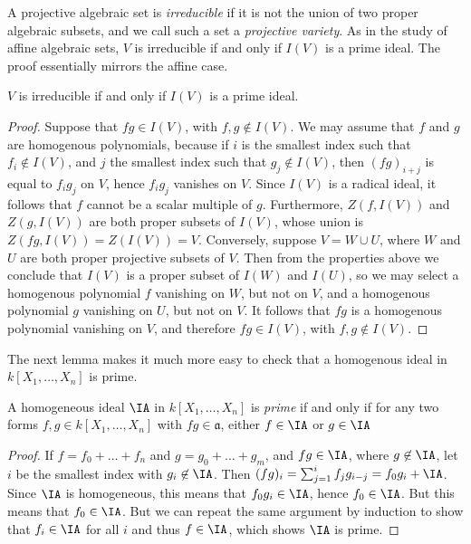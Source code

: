 A projective algebraic set is \emph{irreducible} if it is not the union of two proper algebraic subsets, and we call such a set a \emph{projective variety}. As in the study of affine algebraic sets, $V$ is irreducible if and only if $I(V)$ is a prime ideal. The proof essentially mirrors the affine case.

\begin{theorem}
    $V$ is irreducible if and only if $I(V)$ is a prime ideal.
\end{theorem}
\begin{proof}
    Suppose that $fg \in I(V)$, with $f,g \not \in I(V)$. We may assume that $f$ and $g$ are homogenous polynomials, because if $i$ is the smallest index such that $f_i \not \in I(V)$, and $j$ the smallest index such that $g_j \not \in I(V)$, then $(fg)_{i + j}$ is equal to $f_ig_j$ on $V$, hence $f_ig_j$ vanishes on $V$. Since $I(V)$ is a radical ideal, it follows that $f$ cannot be a scalar multiple of $g$. Furthermore, $Z(f,I(V))$ and $Z(g,I(V))$ are both proper subsets of $I(V)$, whose union is $Z(fg,I(V)) = Z(I(V)) = V$. Conversely, suppose $V = W \cup U$, where $W$ and $U$ are both proper projective subsets of $V$. Then from the properties above we conclude that $I(V)$ is a proper subset of $I(W)$ and $I(U)$, so we may select a homogenous polynomial $f$ vanishing on $W$, but not on $V$, and a homogenous polynomial $g$ vanishing on $U$, but not on $V$. It follows that $fg$ is a homogenous polynomial vanishing on $V$, and therefore $fg \in I(V)$, with $f,g \not \in I(V)$.
\end{proof}

The next lemma makes it much more easy to check that a homogenous ideal in $k[X_1,\dots,X_n]$ is prime.

\begin{lemma}
    A homogeneous ideal $\IA$ in $k[X_1,\dots,X_n]$ is \emph{prime} if and only if for any two forms $f,g \in k[X_1,\dots,X_n]$ with $fg \in \mathfrak{a}$, either $f \in \IA$ or $g \in \IA$
\end{lemma}
\begin{proof}
    If $f = f_0 + \dots + f_n$ and $g = g_0 + \dots + g_m$, and $fg \in \IA$, where $g \not \in \IA$, let $i$ be the smallest index with $g_i \not \in \IA$. Then $(fg)_i = \sum_{j = 1}^i f_jg_{i-j} = f_0g_i + \IA$. Since $\IA$ is homogeneous, this means that $f_0g_i \in \IA$, hence $f_0 \in \IA$. But this means that $f_0 \in \IA$. But we can repeat the same argument by induction to show that $f_i \in \IA$ for all $i$ and thus $f \in \IA$, which shows $\IA$ is prime.
\end{proof}

